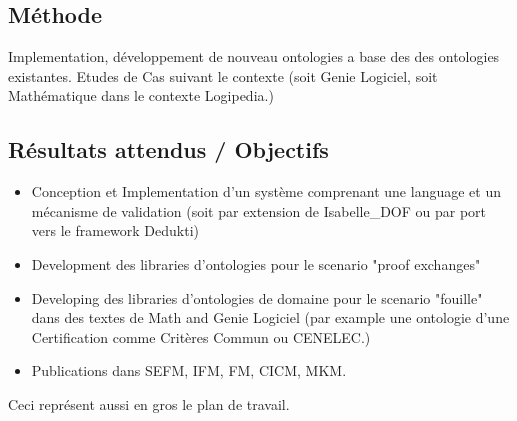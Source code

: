 \documentclass[a4paper,10pt]{article}
\begin{document}
\subsection*{Méthode}
Implementation, développement de nouveau ontologies a base des des ontologies existantes.
Etudes de Cas suivant le contexte (soit Genie Logiciel, soit Mathématique dans le contexte Logipedia.)

\subsection*{Résultats attendus / Objectifs}

\begin{itemize}
\item Conception et Implementation d'un système comprenant une language et un mécanisme de validation
  (soit par extension de Isabelle\_DOF ou par port vers le framework Dedukti)
\item
  Development des libraries d'ontologies pour le scenario "proof exchanges"
\item
  Developing des libraries d'ontologies de domaine pour le scenario "fouille"  dans des textes de Math and Genie Logiciel 
  (par example une ontologie d'une Certification comme Critères Commun ou CENELEC.)
\item Publications dans SEFM, IFM, FM, CICM, MKM.
\end{itemize}

Ceci représent aussi en gros le plan de travail.



\end{document}
